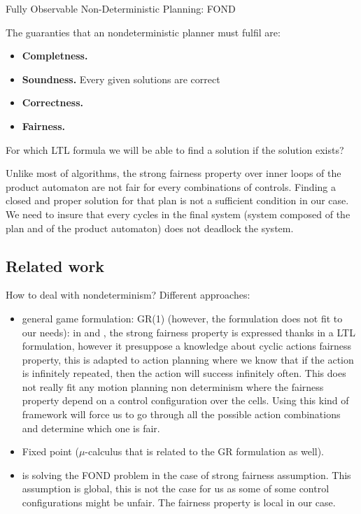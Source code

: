 \documentclass{article}
\theoremstyle{named}
\begin{document}
Fully Observable Non-Deterministic Planning:  FOND

The guaranties that an nondeterministic planner must fulfil are:
\begin{itemize}[noitemsep,nolistsep]
\item \textbf{Completness.}
\item \textbf{Soundness.} Every given solutions are correct
\item \textbf{Correctness.} 
\item \textbf{Fairness.}
\end{itemize}

For which LTL formula we will be able to find a solution if the solution exists?

Unlike most of algorithms, the strong fairness property over inner loops of the product automaton are not fair for every combinations of controls.
Finding a closed and proper solution for that plan is not a sufficient condition in our case. 
We need to insure that every cycles in the final system (system composed of the plan and of the product automaton) does not deadlock the system.

\subsection{Related work}
How to deal with nondeterminism?
Different approaches:
\begin{itemize}
\item general game formulation: GR(1) (however, the formulation does not fit to our needs): in \cite{de2010generalized} and \cite{Kissmann2009}, the strong fairness property is expressed thanks in a LTL formulation, however it presuppose a knowledge about cyclic actions fairness property, this is adapted to action planning where we know that if the action is infinitely repeated, then the action will success infinitely often. This does not really fit any motion planning non determinism where the fairness property depend on a control configuration over the cells. Using this kind of framework will force us to go through all the possible action combinations and determine which one is fair.
\item Fixed point ($\mu$-calculus that is related to the GR formulation as well).
\item \cite{fu2011simple} is solving the FOND problem in the case of strong fairness assumption. This assumption is global, this is not the case for us as some of some control configurations might be unfair. The fairness property is local in our case.
\end{itemize}
\end{document}
